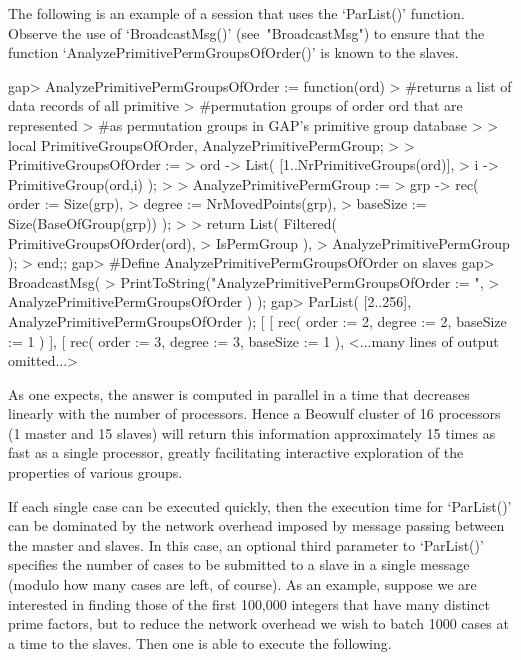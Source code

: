The following is  an  example  of  a  {\ParGAP}  session  that  uses  the
`ParList()'   function.   Observe    the    use    of    `BroadcastMsg()'
(see~"BroadcastMsg")      to      ensure      that      the      function
`AnalyzePrimitivePermGroupsOfOrder()' is known to the slaves.

\beginexample
gap> AnalyzePrimitivePermGroupsOfOrder := function(ord)
>      #returns a list of data records of all primitive 
>      #permutation groups of order ord that are represented 
>      #as permutation groups in GAP's primitive group database
>      
>      local PrimitiveGroupsOfOrder, AnalyzePrimitivePermGroup;
>    
>      PrimitiveGroupsOfOrder :=
>        ord -> List( [1..NrPrimitiveGroups(ord)],
>                     i -> PrimitiveGroup(ord,i) );
>    
>      AnalyzePrimitivePermGroup :=
>        grp -> rec( order := Size(grp),
>                    degree := NrMovedPoints(grp),
>                    baseSize := Size(BaseOfGroup(grp)) );
>    
>      return List( Filtered( PrimitiveGroupsOfOrder(ord),
>                             IsPermGroup ),
>                   AnalyzePrimitivePermGroup );
>    end;;
gap> #Define AnalyzePrimitivePermGroupsOfOrder on slaves
gap> BroadcastMsg( 
>      PrintToString("AnalyzePrimitivePermGroupsOfOrder := ",
>                    AnalyzePrimitivePermGroupsOfOrder ) );
gap> ParList( [2..256], AnalyzePrimitivePermGroupsOfOrder );
[ [ rec( order := 2, degree := 2, baseSize := 1 ) ], 
  [ rec( order := 3, degree := 3, baseSize := 1 ), 
  <...many lines of output omitted...>
\endexample

As one expects, the answer  is  computed  in  parallel  in  a  time  that
decreases linearly with the number of processors. Hence a Beowulf cluster
of 16 processors (1 {\ParGAP} master and 15 {\ParGAP} slaves) will return
this information approximately 15 times as fast as  a  single  processor,
greatly facilitating interactive exploration of the properties of various
groups.

If each single case can be executed quickly, then the execution time  for
`ParList()' can be dominated by the network overhead imposed  by  message
passing between the master and slaves. In this case,  an  optional  third
parameter to `ParList()' specifies the number of cases to be submitted to
a slave in a single message (modulo how many cases are left, of  course).
As an example, suppose we are interested in finding those  of  the  first
100,000 integers that have many distinct prime factors, but to reduce the
network overhead we wish to batch 1000 cases at a  time  to  the  slaves.
Then one is able to execute the following.

